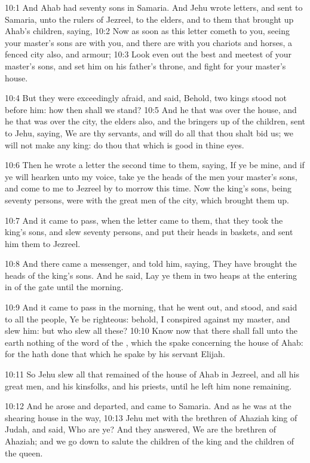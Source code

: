 10:1 And Ahab had seventy sons in Samaria. And Jehu wrote letters, and sent to Samaria, unto the rulers of Jezreel, to the elders, and to them that brought up Ahab's children, saying, 10:2 Now as soon as this letter cometh to you, seeing your master's sons are with you, and there are with you chariots and horses, a fenced city also, and armour; 10:3 Look even out the best and meetest of your master's sons, and set him on his father's throne, and fight for your master's house.

10:4 But they were exceedingly afraid, and said, Behold, two kings stood not before him: how then shall we stand?  10:5 And he that was over the house, and he that was over the city, the elders also, and the bringers up of the children, sent to Jehu, saying, We are thy servants, and will do all that thou shalt bid us; we will not make any king: do thou that which is good in thine eyes.

10:6 Then he wrote a letter the second time to them, saying, If ye be mine, and if ye will hearken unto my voice, take ye the heads of the men your master's sons, and come to me to Jezreel by to morrow this time. Now the king's sons, being seventy persons, were with the great men of the city, which brought them up.

10:7 And it came to pass, when the letter came to them, that they took the king's sons, and slew seventy persons, and put their heads in baskets, and sent him them to Jezreel.

10:8 And there came a messenger, and told him, saying, They have brought the heads of the king's sons. And he said, Lay ye them in two heaps at the entering in of the gate until the morning.

10:9 And it came to pass in the morning, that he went out, and stood, and said to all the people, Ye be righteous: behold, I conspired against my master, and slew him: but who slew all these?  10:10 Know now that there shall fall unto the earth nothing of the word of the \LORD, which the \LORD spake concerning the house of Ahab: for the \LORD hath done that which he spake by his servant Elijah.

10:11 So Jehu slew all that remained of the house of Ahab in Jezreel, and all his great men, and his kinsfolks, and his priests, until he left him none remaining.

10:12 And he arose and departed, and came to Samaria. And as he was at the shearing house in the way, 10:13 Jehu met with the brethren of Ahaziah king of Judah, and said, Who are ye? And they answered, We are the brethren of Ahaziah; and we go down to salute the children of the king and the children of the queen.

